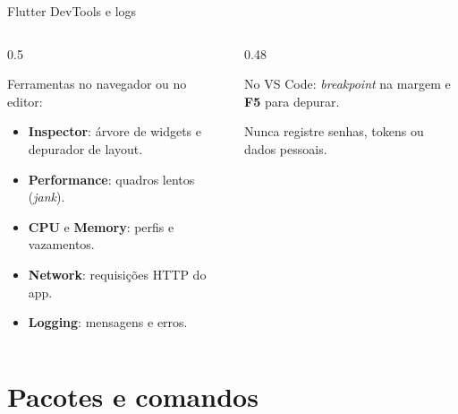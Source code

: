 \documentclass[aspectratio=169,10pt]{beamer}
\begin{document}
\begin{frame}[fragile]{Flutter DevTools e logs}
  \begin{columns}[T]
    \begin{column}{0.5\textwidth}
      \begin{conceito}[DevTools]
        Ferramentas no navegador ou no editor:
        \begin{itemize}
          \item \textbf{Inspector}: árvore de widgets e depurador de layout.
          \item \textbf{Performance}: quadros lentos (\emph{jank}).
          \item \textbf{CPU} e \textbf{Memory}: perfis e vazamentos.
          \item \textbf{Network}: requisições HTTP do app.
          \item \textbf{Logging}: mensagens e erros.
        \end{itemize}
      \end{conceito}
    \end{column}
    \begin{column}{0.48\textwidth}
      \begin{dica}[Depurador]
        No VS Code: \emph{breakpoint} na margem e \textbf{F5} para depurar.
      \end{dica}
      \begin{atencao}
        Nunca registre senhas, tokens ou dados pessoais.
      \end{atencao}
    \end{column}
  \end{columns}
\end{frame}

\section{Pacotes e comandos}
\end{document}

